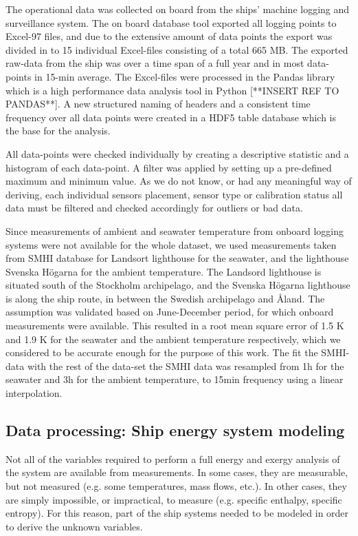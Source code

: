 \documentclass[preprint,12pt]{elsarticle}
\begin{document}
The operational data was collected on board from the ships' machine logging and surveillance system. The on board database tool exported all logging points to Excel-97 files, and due to the extensive amount of data points the export was divided in to 15 individual Excel-files consisting of a total 665 MB. The exported raw-data from the ship was over a time span of a full year and in most data-points in 15-min average. The Excel-files were processed in the Pandas library which is a high performance data analysis tool in Python [**INSERT REF TO PANDAS**]. A new structured naming of headers and a consistent time frequency over all data points were created in a HDF5 table database which is the base for the analysis.

All data-points were checked individually by creating a descriptive statistic and a histogram of each data-point. A filter was applied by setting up a pre-defined maximum and minimum value. As we do not know, or had any meaningful way of deriving, each individual sensors placement, sensor type or calibration status all data must be filtered and checked accordingly for outliers or bad data. 


Since measurements of ambient and seawater temperature from onboard logging systems were not available for the whole dataset, we used measurements taken from SMHI database for Landsort lighthouse for the seawater, and the lighthouse Svenska Högarna for the ambient temperature. The Landsord lighthouse is situated south of the Stockholm archipelago, and the Svenska Högarna lighthouse is along the ship route, in between the Swedish archipelago and Åland. The assumption was validated based on  June-December period, for which onboard measurements were available. This resulted in a root mean square error of 1.5 K and 1.9 K for the seawater and the ambient temperature respectively, which we considered to be accurate enough for the purpose of this work. The fit the SMHI-data with the rest of the data-set the SMHI data was resampled from 1h for the seawater and 3h for the ambient temperature, to 15min frequency using a linear interpolation.

\subsection{Data processing: Ship energy system modeling} \label{sec:met:modeling}

Not all of the variables required to perform a full energy and exergy analysis of the system are available from measurements. In some cases, they are measurable, but not measured (e.g. some temperatures, mass flows, etc.). In other cases, they are simply impossible, or impractical, to measure (e.g. specific enthalpy, specific entropy). For this reason, part of the ship systems needed to be modeled in order to derive the unknown variables. 
\end{document}
